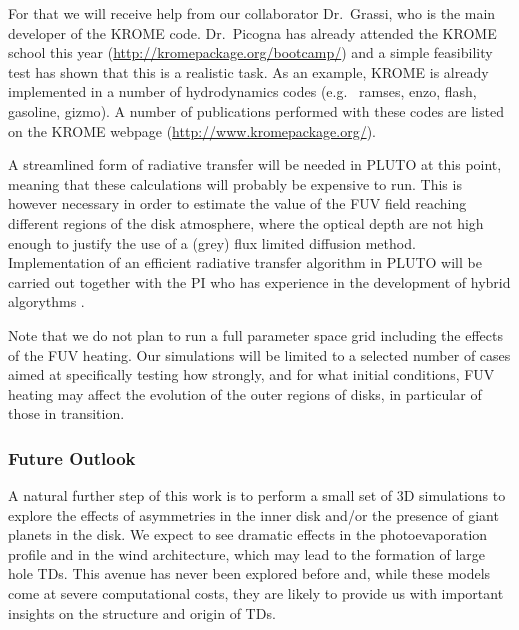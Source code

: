 \documentclass[10pt,fleqn,twoside]{article}
\begin{document}
 For 
that we will receive help from our collaborator Dr.\ Grassi, who is the main
developer of the KROME code. Dr.\ Picogna has already attended the KROME
school this year (\url{http://kromepackage.org/bootcamp/}) and a simple
feasibility test has shown that this is a realistic task. As an example,
KROME is already implemented in a number of hydrodynamics codes (e.g.\ {\sc
  ramses, enzo, flash, gasoline, gizmo}). A number of publications performed
with these codes are listed on the KROME webpage
(\url{http://www.kromepackage.org/}).

A streamlined form of radiative transfer
will be needed in PLUTO at this point, meaning that these calculations will
probably be expensive to run.  This is however necessary in order to
estimate the value of the  FUV field reaching different regions of the
disk atmosphere, where the optical depth are not high enough to
justify the use of a  (grey) flux limited diffusion method.
Implementation of an efficient radiative transfer algorithm in PLUTO
will be carried out together with the PI who has experience in the
development of hybrid algorythms 
\citep[e.g.,][]{2014ASSP...36..127O}.

Note that we do not plan to run a full
parameter space grid including the effects of the FUV heating. 
Our simulations will be limited to a selected number of cases
aimed at specifically testing how strongly, and for what initial
conditions, FUV heating may affect the evolution of the outer regions
of disks, in particular of those in transition.\\

\subsubsection{Future Outlook}

A natural further step of this work is to perform a small set of 3D
simulations to explore the effects of asymmetries in the inner
disk and/or the presence of giant planets in the disk. We expect to
see dramatic effects in the photoevaporation 
profile and in the wind architecture, which may lead to the formation
of large hole TDs. This avenue has never been explored before and,
while these models come at severe computational costs, they are likely to provide us
with important insights on the structure and origin of TDs. 
\end{document}
